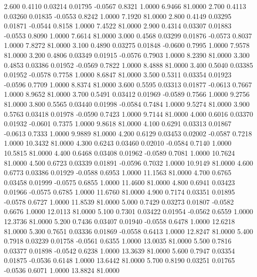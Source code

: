   2.600   0.4110   0.03214   0.01795  -0.0567   0.8321   1.0000   6.9466  81.0000
   2.700   0.4113   0.03260   0.01835  -0.0553   0.8242   1.0000   7.1920  81.0000
   2.800   0.4149   0.03295   0.01871  -0.0544   0.8158   1.0000   7.4522  81.0000
   2.900   0.4314   0.03307   0.01883  -0.0553   0.8090   1.0000   7.6614  81.0000
   3.000   0.4568   0.03299   0.01876  -0.0573   0.8037   1.0000   7.8272  81.0000
   3.100   0.4890   0.03275   0.01848  -0.0600   0.7995   1.0000   7.9578  81.0000
   3.200   0.4806   0.03349   0.01915  -0.0576   0.7903   1.0000   8.2390  81.0000
   3.300   0.4853   0.03386   0.01952  -0.0569   0.7822   1.0000   8.4888  81.0000
   3.400   0.5040   0.03385   0.01952  -0.0578   0.7758   1.0000   8.6847  81.0000
   3.500   0.5311   0.03354   0.01923  -0.0596   0.7709   1.0000   8.8374  81.0000
   3.600   0.5595   0.03313   0.01877  -0.0613   0.7667   1.0000   8.9652  81.0000
   3.700   0.5491   0.03412   0.01969  -0.0589   0.7566   1.0000   9.2756  81.0000
   3.800   0.5565   0.03440   0.01998  -0.0584   0.7484   1.0000   9.5274  81.0000
   3.900   0.5763   0.03418   0.01978  -0.0590   0.7423   1.0000   9.7144  81.0000
   4.000   0.6016   0.03370   0.01932  -0.0601   0.7375   1.0000   9.8618  81.0000
   4.100   0.6291   0.03313   0.01867  -0.0613   0.7333   1.0000   9.9889  81.0000
   4.200   0.6129   0.03453   0.02002  -0.0587   0.7218   1.0000  10.3432  81.0000
   4.300   0.6243   0.03460   0.02010  -0.0584   0.7140   1.0000  10.5815  81.0000
   4.400   0.6468   0.03408   0.01962  -0.0589   0.7081   1.0000  10.7624  81.0000
   4.500   0.6723   0.03339   0.01891  -0.0596   0.7032   1.0000  10.9149  81.0000
   4.600   0.6773   0.03386   0.01929  -0.0588   0.6953   1.0000  11.1563  81.0000
   4.700   0.6765   0.03458   0.01999  -0.0575   0.6855   1.0000  11.4600  81.0000
   4.800   0.6941   0.03423   0.01966  -0.0575   0.6785   1.0000  11.6760  81.0000
   4.900   0.7174   0.03351   0.01895  -0.0578   0.6727   1.0000  11.8539  81.0000
   5.000   0.7429   0.03273   0.01807  -0.0582   0.6676   1.0000  12.0113  81.0000
   5.100   0.7301   0.03422   0.01954  -0.0562   0.6559   1.0000  12.3736  81.0000
   5.200   0.7436   0.03407   0.01940  -0.0558   0.6478   1.0000  12.6218  81.0000
   5.300   0.7651   0.03336   0.01869  -0.0558   0.6413   1.0000  12.8247  81.0000
   5.400   0.7918   0.03239   0.01758  -0.0561   0.6355   1.0000  13.0035  81.0000
   5.500   0.7816   0.03377   0.01898  -0.0542   0.6238   1.0000  13.3639  81.0000
   5.600   0.7947   0.03354   0.01875  -0.0536   0.6148   1.0000  13.6442  81.0000
   5.700   0.8190   0.03251   0.01765  -0.0536   0.6071   1.0000  13.8824  81.0000
